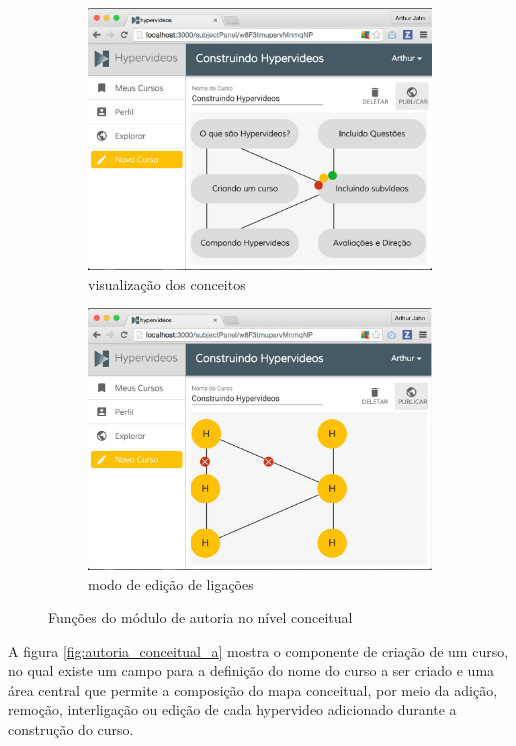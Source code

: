 \begin{figure}[h!]
	\begin{subfigure}{.5\textwidth}
  		\centering
  		\includegraphics[width=.9\linewidth]{figuras/autoria_conceitual_c.eps}
  		\caption{visualização dos conceitos}
  		\label{fig:autoria_conceitual_c}
	\end{subfigure}%
	\begin{subfigure}{.5\textwidth}
  		\centering
  		\includegraphics[width=.9\linewidth]{figuras/autoria_conceitual_d.eps}
  		\caption{modo de edição de ligações}
  		\label{fig:autoria_conceitual_d}
	\end{subfigure}%
  	\caption{Funções do módulo de autoria no nível conceitual}
  	\label{fig:autoria_conceitual}
\end{figure}

A figura \ref{fig:autoria_conceitual_a} mostra o componente de criação de um curso, no qual existe um campo para a definição do nome do curso a ser criado e uma área central que permite a composição do mapa conceitual, por meio da adição, remoção, interligação ou edição de cada hypervideo adicionado durante a construção do curso. 

